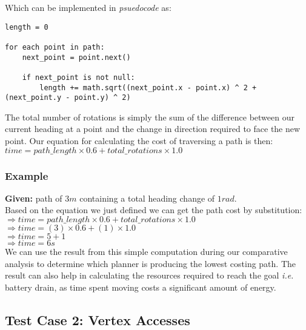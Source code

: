 \noindent
Which can be implemented in \textit{psuedocode} as: \\

\begin{lstlisting}
length = 0

for each point in path:
	next_point = point.next()
	
	if next_point is not null:
		length += math.sqrt((next_point.x - point.x) ^ 2 + (next_point.y - point.y) ^ 2)
\end{lstlisting}

\noindent
The total number of rotations is simply the sum of the difference between our current heading at a point and the change in direction required to face the new point. Our equation for calculating the cost of traversing a path is then: \\

\indent $time = path\_length \times 0.6 + total\_rotations \times 1.0$ \\

\newpage

\subsubsection{Example}

\noindent
\textbf{Given:} path of $3m$ containing a total heading change of $1rad$. \\

\noindent
Based on the equation we just defined we can get the path cost by substitution: \\

\indent $\Rightarrow time = path\_length \times 0.6 + total\_rotations \times 1.0$ \\
\indent $\Rightarrow time = (3) \times 0.6 + (1) \times 1.0$ \\
\indent $\Rightarrow time = 5 + 1$ \\
\indent $\Rightarrow time = 6s$ \\

\noindent
We can use the result from this simple computation during our comparative analysis to determine which planner is producing the lowest costing path. The result can also help in calculating the resources required to reach the goal \textit{i.e.} battery drain, as time spent moving costs a significant amount of energy.

\subsection{Test Case 2: Vertex Accesses}\label{test 2}

